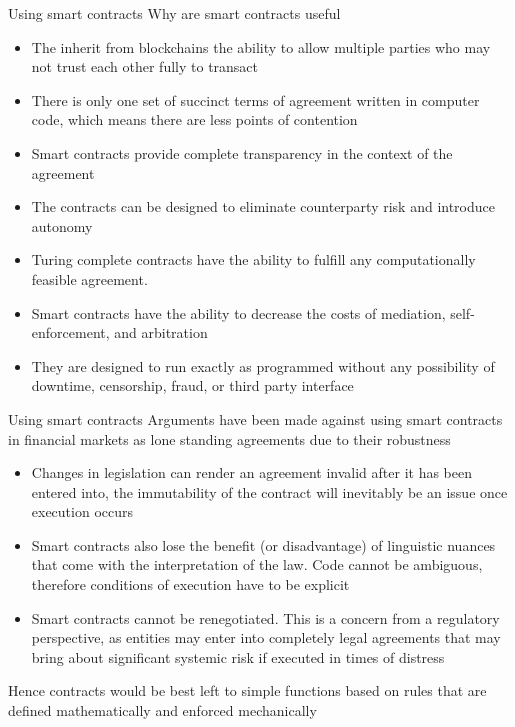 \documentclass[9pt]{beamer}
\begin{document}
\begin{frame}{Using smart contracts}
	Why are smart contracts useful
	\begin{itemize}
		\item The inherit from blockchains the ability to allow multiple parties who may not trust each other fully to transact
		\item There is only one set of succinct terms of agreement written in computer code, which means there are less points of contention
		\item Smart contracts provide complete transparency in the context of the agreement
		\item The contracts can be designed to eliminate counterparty risk and introduce autonomy
		\item Turing complete contracts have the ability to fulfill any computationally feasible agreement.
		\item Smart contracts have the ability to decrease the costs of mediation, self-enforcement, and arbitration
		\item They are designed to run exactly as programmed without any possibility of downtime, censorship, fraud, or third party interface
	\end{itemize}
\end{frame}



\begin{frame}{Using smart contracts}
	Arguments have been made against using smart contracts in financial markets as lone standing agreements due to their robustness
	\begin{itemize}
		\item Changes in legislation can render an agreement invalid after it has been entered into, the immutability of the contract will inevitably be an issue once execution occurs
		\item Smart contracts also lose the benefit (or disadvantage) of linguistic nuances that come with the interpretation of the law. Code cannot be ambiguous, therefore conditions of execution have to be explicit
		\item Smart contracts cannot be renegotiated. This is a concern from a regulatory perspective, as entities may enter into completely legal agreements that may bring about significant systemic risk if executed in times of distress
	\end{itemize}
	Hence contracts would be best left to simple functions based on rules that are defined mathematically and enforced mechanically
\end{frame}
\end{document}
